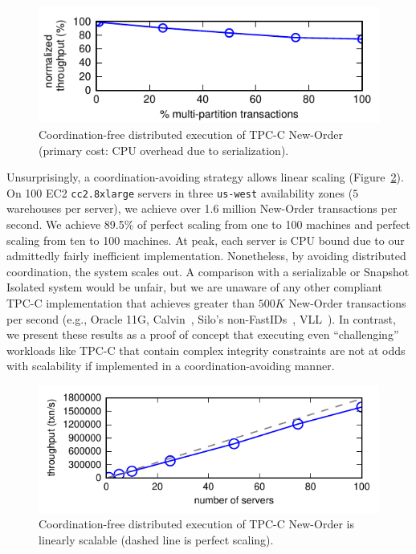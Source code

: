 \begin{figure}
\includegraphics[width=\columnwidth]{figs/pct_thru.pdf}\vspace{-1em}
\caption{Coordination-free distributed execution of TPC-C New-Order
  (primary cost: CPU overhead due to serialization).}
\label{fig:pct}
\end{figure}

Unsurprisingly, a coordination-avoiding strategy allows linear scaling
(Figure~\ref{fig:scaleout}). On 100 EC2 \texttt{cc2.8xlarge} servers
in three \texttt{us-west} availability zones ($5$ warehouses per
server), we achieve over 1.6 million New-Order transactions per
second. We achieve 89.5\% of perfect scaling from one to 100 machines
and perfect scaling from ten to 100 machines. At peak, each server is
CPU bound due to our admittedly fairly inefficient
implementation. Nonetheless, by avoiding distributed coordination, 
the system scales out. A comparison with a serializable or Snapshot
Isolated system would be unfair, but we are unaware of any other
compliant TPC-C implementation that achieves greater than $500K$
New-Order transactions per second (e.g., Oracle 11G,
Calvin~\cite{calvin}, Silo's non-FastIDs~\cite{silo},
VLL~\cite{abadi-vll}). In contrast, we present these results as a
proof of concept that executing even ``challenging'' workloads like
TPC-C that contain complex integrity constraints are not at odds with
scalability if implemented in a coordination-avoiding manner.

\begin{figure}
\begin{center}
\includegraphics[width=\columnwidth]{figs/thru_scale.pdf}\vspace{-2em}
\end{center}
\caption{Coordination-free distributed execution of TPC-C New-Order is
  linearly scalable (dashed line is perfect scaling).}
\label{fig:scaleout}
\end{figure}

